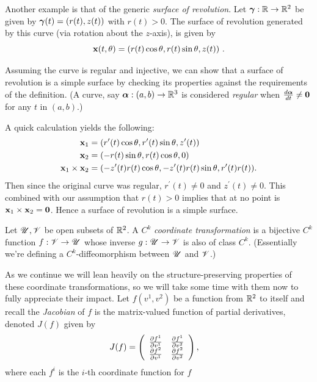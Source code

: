   \begin{ex} %
    \label{ex:revolution}
    Another example is that of the generic \emph{surface of revolution}. Let $\boldsymbol{\gamma}:\mathbb{R}\to\mathbb{R}^2$ be given by $\boldsymbol{\gamma}(t) = (r(t), z(t))$ with $r(t) > 0$. The surface of revolution generated by this curve (via rotation about the $z$-axis), is given by
    \[
      \mathbf{x}(t, \theta) = (r(t)\cos\theta, r(t)\sin\theta, z(t)) \ .
    \]

    Assuming the curve is regular and injective, we can show that a surface of revolution is a simple surface by checking its properties against the requirements of the definition. (A curve, say $\boldsymbol{\alpha} : (a, b) \to \mathbb{R}^3$ is considered \emph{regular} when $\frac{d\boldsymbol{\alpha}}{dt} \neq \mathbf{0}$ for any $t$ in $(a, b)$.)

    A quick calculation yields the following:
    \begin{align*}
      \mathbf{x}_1 &= (r^\prime(t)\cos{\theta}, r^\prime(t)\sin{\theta}, z^\prime(t))\\
      \mathbf{x}_2 &= (-r(t)\sin{\theta}, r(t)\cos{\theta}, 0)\\
      \mathbf{x}_1 \times \mathbf{x}_2 &= (-z^\prime(t) r(t) \cos{\theta}, -z^\prime(t) r(t) \sin{\theta}, r^\prime(t)r(t)).
    \end{align*}
    Then since the original curve was regular, $r^\prime(t) \neq 0$ and $z^\prime(t) \neq 0$. This combined with our assumption that $r(t) > 0$ implies that at no point is $\mathbf{x}_1 \times \mathbf{x}_2 = \mathbf{0}$. Hence a surface of revolution is a simple surface.
  \end{ex}


  \begin{defn} %
    Let $\mathscr{U}, \mathscr{V}$ be open subsets of $\mathbb{R}^2$. A $C^k$ \emph{coordinate transformation} is a bijective $C^k$ function $f: \mathscr{V} \to \mathscr{U}$ whose inverse $g:\mathscr{U} \to \mathscr{V}$ is also of class $C^k$. (Essentially we're defining a $C^k$-diffeomorphism between $\mathscr{U}$ and $\mathscr{V}$.)
  \end{defn}

  As we continue we will lean heavily on the structure-preserving properties of these coordinate transformations, so we will take some time with them now to fully appreciate their impact. Let $f(v^1, v^2)$ be a function from $\mathbb{R}^2$ to itself and recall the \emph{Jacobian} of $f$ is the matrix-valued function of partial derivatives, denoted $J(f)$ given by
  \begingroup
    \renewcommand*{\arraystretch}{1.4}
    \begin{align*}
      J(f) &= \left(
      \begin{array}{cc}
        \frac{\partial f^1}{\partial v^1} & \frac{\partial f^1}{\partial v^2}\\
        \frac{\partial f^2}{\partial v^1} & \frac{\partial f^2}{\partial v^2}
      \end{array}
      \right),
    \end{align*}
    where each $f^i$ is the $i$-th coordinate function for $f$
  \endgroup


